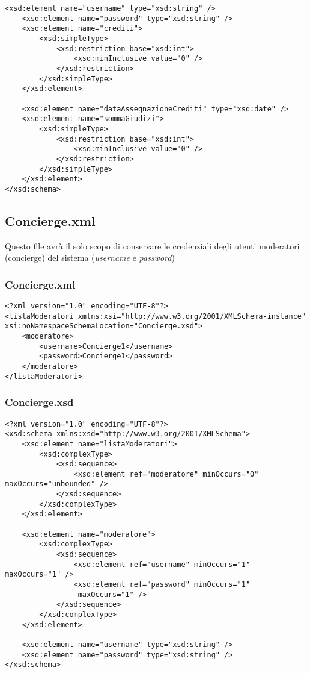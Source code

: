 \documentclass [a4paper, 12pt]{book}
\begin{document}
\begin{lstlisting}[style=XML]
    <xsd:element name="username" type="xsd:string" />
    <xsd:element name="password" type="xsd:string" />
    <xsd:element name="crediti">
        <xsd:simpleType>
            <xsd:restriction base="xsd:int">
                <xsd:minInclusive value="0" />
            </xsd:restriction>
        </xsd:simpleType>
    </xsd:element>

    <xsd:element name="dataAssegnazioneCrediti" type="xsd:date" />
    <xsd:element name="sommaGiudizi">
        <xsd:simpleType>
            <xsd:restriction base="xsd:int">
                <xsd:minInclusive value="0" />
            </xsd:restriction>
        </xsd:simpleType>
    </xsd:element>
</xsd:schema>

\end{lstlisting}

\subsection{Concierge.xml}
Questo file avrà il solo scopo di conservare le credenziali degli utenti moderatori (concierge) del sistema (\textit{username} e \textit{password})

\subsubsection{Concierge.xml}
\begin{lstlisting}[style=XML]
<?xml version="1.0" encoding="UTF-8"?>
<listaModeratori xmlns:xsi="http://www.w3.org/2001/XMLSchema-instance" xsi:noNamespaceSchemaLocation="Concierge.xsd">
    <moderatore>
        <username>Concierge1</username>
        <password>Concierge1</password>
    </moderatore>
</listaModeratori>
\end{lstlisting}
\subsubsection{Concierge.xsd}
\begin{lstlisting}[style=XML]
<?xml version="1.0" encoding="UTF-8"?>
<xsd:schema xmlns:xsd="http://www.w3.org/2001/XMLSchema">
    <xsd:element name="listaModeratori">
        <xsd:complexType>
            <xsd:sequence>
                <xsd:element ref="moderatore" minOccurs="0" maxOccurs="unbounded" />
            </xsd:sequence>
        </xsd:complexType>
    </xsd:element>

    <xsd:element name="moderatore">
        <xsd:complexType>
            <xsd:sequence>
                <xsd:element ref="username" minOccurs="1" maxOccurs="1" />
                <xsd:element ref="password" minOccurs="1"
                 maxOccurs="1" />
            </xsd:sequence>
        </xsd:complexType>
    </xsd:element>

    <xsd:element name="username" type="xsd:string" />
    <xsd:element name="password" type="xsd:string" />
</xsd:schema>
\end{lstlisting}
\end{document}

